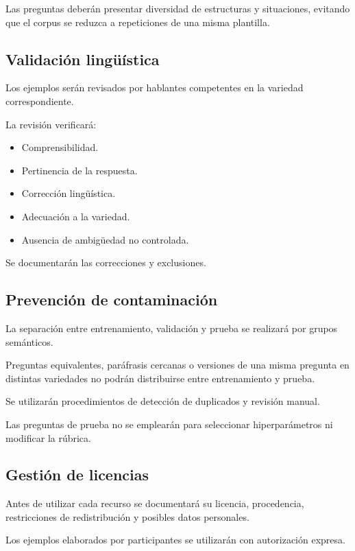Las preguntas deberán presentar diversidad de estructuras y situaciones, evitando que el corpus se reduzca a repeticiones de una misma plantilla.

\subsection{Validación lingüística}\label{validaciuxf3n-linguxfcuxedstica}

Los ejemplos serán revisados por hablantes competentes en la variedad correspondiente.

La revisión verificará:

\begin{itemize}
\tightlist
\item
  Comprensibilidad.
\item
  Pertinencia de la respuesta.
\item
  Corrección lingüística.
\item
  Adecuación a la variedad.
\item
  Ausencia de ambigüedad no controlada.
\end{itemize}

Se documentarán las correcciones y exclusiones.

\subsection{Prevención de contaminación}\label{prevenciuxf3n-de-contaminaciuxf3n}

La separación entre entrenamiento, validación y prueba se realizará por grupos semánticos.

Preguntas equivalentes, paráfrasis cercanas o versiones de una misma pregunta en distintas variedades no podrán distribuirse entre entrenamiento y prueba.

Se utilizarán procedimientos de detección de duplicados y revisión manual.

Las preguntas de prueba no se emplearán para seleccionar hiperparámetros ni modificar la rúbrica.

\subsection{Gestión de licencias}\label{gestiuxf3n-de-licencias}

Antes de utilizar cada recurso se documentará su licencia, procedencia, restricciones de redistribución y posibles datos personales.

Los ejemplos elaborados por participantes se utilizarán con autorización expresa.

